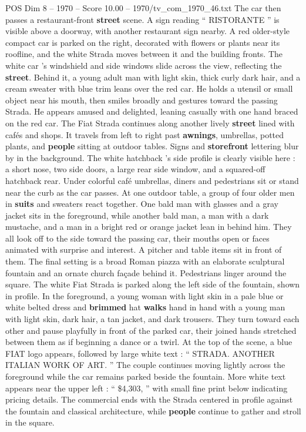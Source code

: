 \begin{textsample}{POS Dim 8 – 1970 – Score 10.00 – 1970/tv\_com\_1970\_46.txt}
The car then passes a restaurant-front \textbf{street} scene.
A sign reading “ RISTORANTE ” is visible above a doorway, with another restaurant sign nearby.
A red older-style compact car is parked on the right, decorated with flowers or plants near its roofline, and the white Strada moves between it and the building fronts.
The white car ’s windshield and side windows slide across the view, reflecting the \textbf{street}.
Behind it, a young adult man with light skin, thick curly dark hair, and a cream sweater with blue trim leans over the red car.
He holds a utensil or small object near his mouth, then smiles broadly and gestures toward the passing Strada.
He appears amused and delighted, leaning casually with one hand braced on the red car.
The Fiat Strada continues along another lively \textbf{street} lined with cafés and shops.
It travels from left to right past \textbf{awnings}, umbrellas, potted plants, and \textbf{people} sitting at outdoor tables.
Signs and \textbf{storefront} lettering blur by in the background.
The white hatchback ’s side profile is clearly visible here : a short nose, two side doors, a large rear side window, and a squared-off hatchback rear.
Under colorful café umbrellas, diners and pedestrians sit or stand near the curb as the car passes.
At one outdoor table, a group of four older men in \textbf{suits} and sweaters react together.
One bald man with glasses and a gray jacket sits in the foreground, while another bald man, a man with a dark mustache, and a man in a bright red or orange jacket lean in behind him.
They all look off to the side toward the passing car, their mouths open or faces animated with surprise and interest.
A pitcher and table items sit in front of them.
The final setting is a broad Roman piazza with an elaborate sculptural fountain and an ornate church façade behind it.
Pedestrians linger around the square.
The white Fiat Strada is parked along the left side of the fountain, shown in profile.
In the foreground, a young woman with light skin in a pale blue or white belted dress and \textbf{brimmed} hat \textbf{walks} hand in hand with a young man with light skin, dark hair, a tan jacket, and dark trousers.
They turn toward each other and pause playfully in front of the parked car, their joined hands stretched between them as if beginning a dance or a twirl.
At the top of the scene, a blue FIAT logo appears, followed by large white text : “ STRADA.
ANOTHER ITALIAN WORK OF ART. ” The couple continues moving lightly across the foreground while the car remains parked beside the fountain.
More white text appears near the upper left : “ \$4,303, ” with small fine print below indicating pricing details.
The commercial ends with the Strada centered in profile against the fountain and classical architecture, while \textbf{people} continue to gather and stroll in the square.

\end{textsample}
